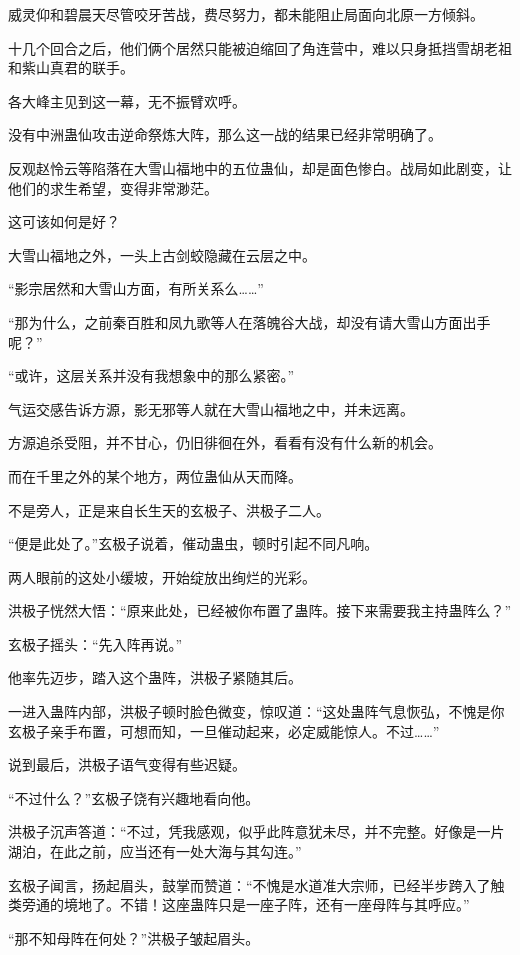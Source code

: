 \begin{this_body}
威灵仰和碧晨天尽管咬牙苦战，费尽努力，都未能阻止局面向北原一方倾斜。

十几个回合之后，他们俩个居然只能被迫缩回了角连营中，难以只身抵挡雪胡老祖和紫山真君的联手。

各大峰主见到这一幕，无不振臂欢呼。

没有中洲蛊仙攻击逆命祭炼大阵，那么这一战的结果已经非常明确了。

反观赵怜云等陷落在大雪山福地中的五位蛊仙，却是面色惨白。战局如此剧变，让他们的求生希望，变得非常渺茫。

这可该如何是好？

大雪山福地之外，一头上古剑蛟隐藏在云层之中。

“影宗居然和大雪山方面，有所关系么……”

“那为什么，之前秦百胜和凤九歌等人在落魄谷大战，却没有请大雪山方面出手呢？”

“或许，这层关系并没有我想象中的那么紧密。”

气运交感告诉方源，影无邪等人就在大雪山福地之中，并未远离。

方源追杀受阻，并不甘心，仍旧徘徊在外，看看有没有什么新的机会。

而在千里之外的某个地方，两位蛊仙从天而降。

不是旁人，正是来自长生天的玄极子、洪极子二人。

“便是此处了。”玄极子说着，催动蛊虫，顿时引起不同凡响。

两人眼前的这处小缓坡，开始绽放出绚烂的光彩。

洪极子恍然大悟：“原来此处，已经被你布置了蛊阵。接下来需要我主持蛊阵么？”

玄极子摇头：“先入阵再说。”

他率先迈步，踏入这个蛊阵，洪极子紧随其后。

一进入蛊阵内部，洪极子顿时脸色微变，惊叹道：“这处蛊阵气息恢弘，不愧是你玄极子亲手布置，可想而知，一旦催动起来，必定威能惊人。不过……”

说到最后，洪极子语气变得有些迟疑。

“不过什么？”玄极子饶有兴趣地看向他。

洪极子沉声答道：“不过，凭我感观，似乎此阵意犹未尽，并不完整。好像是一片湖泊，在此之前，应当还有一处大海与其勾连。”

玄极子闻言，扬起眉头，鼓掌而赞道：“不愧是水道准大宗师，已经半步跨入了触类旁通的境地了。不错！这座蛊阵只是一座子阵，还有一座母阵与其呼应。”

“那不知母阵在何处？”洪极子皱起眉头。


\end{this_body}
